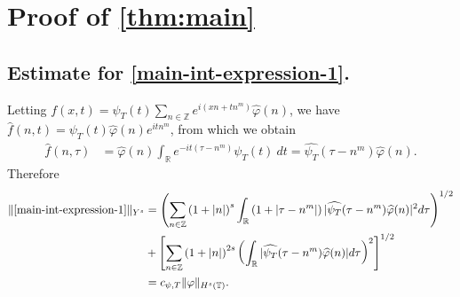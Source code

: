 \documentclass[12pt,reqno]{amsart}
\numberwithin{equation}{section}  %
\numberwithin{figure}{section}
\newcommand{\rr}{\mathbb{R}}
\newcommand{\zz}{\mathbb{Z}}
\newcommand{\ci}{\mathbb{T}}
\newcommand{\wh}{\widehat}
\newcommand{\vp}{\varphi}
\theoremstyle{plain}
\theoremstyle{definition}
\theoremstyle{remark}
\begin{document}
\section{Proof of \autoref{thm:main}}
%
%
%
%
%
%
%
%
%
%
%
\subsection{Estimate for \eqref{main-int-expression-1}.}
%
%
Letting $f(x,t) = \psi_{T}(t) \sum_{n \in \zz} e^{i(xn + tn^{m})} 
\wh{\vp}(n)$, we have $\wh{f}(n,t) = \psi_{T}(t) \wh{\vp}(n) e^{itn^{m}}$,
from which we obtain
%
%
\begin{equation}
	\label{fourier-trans-calc}
	\begin{split}
		\wh{f}(n, \tau)
		& = \wh{\vp}(n) \int_\rr e^{-it( \tau - n^{m})} 
		\psi_{T}(t) \ d t
    = \wh{\psi_{T}}(\tau - n^{m}) \wh{\vp}(n).
	\end{split}
\end{equation}
%
%
%
%
%
%
Therefore
%
\begin{equation}
	\begin{split}
	\label{main-int1-est}
		\|\eqref{main-int-expression-1}\|_{Y^s}
		& = \left (  \sum_{n\in \zz} \left (1 + |n| \right )^s \int_\rr \left( 1 + | \tau - n^{m} 
		| \right )
    | \wh{\psi_{T}}(\tau - n^{m}) \wh{\vp}(n) |^2 d \tau \right)^{1/2} 
		\\
		& + \left[ \sum_{n \in \zz }\left( 1 + | n | \right)^{2s} \left( \int_{\rr} |
    \wh{\psi_{T}}(\tau - n^{m})\wh{\vp}(n) | d \tau
		\right)^{2} \right]^{1/2}
		\\
    & = c_{\psi, T}
		\|\vp\|_{H^s(\ci)}.
	\end{split}
\end{equation}
%
%
%
%
\end{document}
